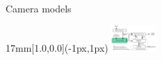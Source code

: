 \begin{frame}{Camera models}
  \begin{textblock*}{17mm}[1.0,0.0](\paperwidth-1px,1px)
    \includegraphics[width=17mm]{blocos_s2.png}
  \end{textblock*}
\end{frame}
\addtocounter{framenumber}{-1}


